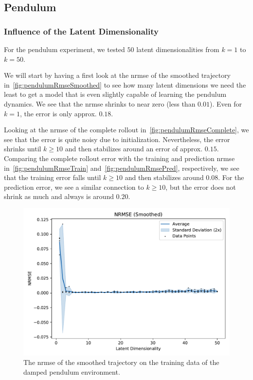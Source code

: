 	\subsection{Pendulum}

		\subsubsection{Influence of the Latent Dimensionality}
			For the pendulum experiment, we tested \(50\) latent dimensionalities from \( k = 1 \) to \( k = 50 \).

			We will start by having a first look at the \ac{nrmse} of the smoothed trajectory in~\autoref{fig:pendulumRmseSmoothed} to see how many latent dimensions we need the least to get a model that is even slightly capable of learning the pendulum dynamics. We see that the \ac{nrmse} shrinks to near zero (less than \( 0.01 \)). Even for \( k = 1 \), the error is only approx. \( 0.18 \).

			Looking at the \ac{nrmse} of the complete rollout in~\autoref{fig:pendulumRmseComplete}, we see that the error is quite noisy due to initialization. Nevertheless, the error shrinks until \( k \geq 10 \) and then stabilizes around an error of approx. \(0.15\). Comparing the complete rollout error with the training and prediction \ac{nrmse} in~\autoref{fig:pendulumRmseTrain} and~\autoref{fig:pendulumRmsePred}, respectively, we see that the training error falls until \( k \geq 10 \) and then stabilizes around \(0.08\). For the prediction error, we see a similar connection to \( k \geq 10 \), but the error does not shrink as much and always is around \(0.20\).

			\begin{figure}
				\centering
				\includegraphics[width=0.7\linewidth]{figures/results/pendulum-damped/latent-dim/comparison-rmse-smoothed-normalized-mean-vs-latent-dim.pdf}
				\caption{The \ac{nrmse} of the smoothed trajectory on the training data of the damped pendulum environment.}
				\label{fig:pendulumRmseSmoothed}
			\end{figure}

